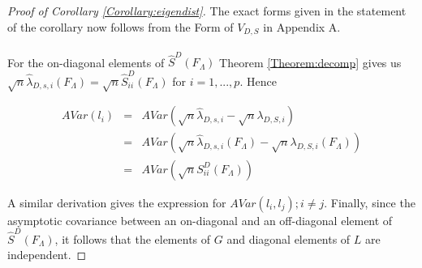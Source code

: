 \begin{proof}[Proof of Corollary \ref{Corollary:eigendist}]
The exact forms given in the statement of the corollary now follows from the  Form of $V_{D,S}$ in Appendix A.

\paragraph{}For the on-diagonal elements of $\hat S^D(F_\Lambda)$ Theorem \ref{Theorem:decomp} gives us $ \sqrt n \hat\lambda_{D,s,i} (F_\Lambda) = \sqrt n \hat S^D_{ii}(F_\Lambda)$ for $i = 1,...,p$. Hence

\begin{eqnarray*}
AVar(l_i) &=& AVar(\sqrt n \hat\lambda_{D,s,i} - \sqrt n \lambda_{D,S,i})\\
&=& AVar(\sqrt n \hat\lambda_{D,s,i} (F_\Lambda) - \sqrt n \lambda_{D,S,i}(F_\Lambda))\\
&=& AVar(\sqrt n S^D_{ii}(F_\Lambda))
\end{eqnarray*}

A similar derivation gives the expression for $AVar(l_i,l_j); i \neq j$. Finally, since the asymptotic covariance between an on-diagonal and an off-diagonal element of $\hat S^D(F_\Lambda)$, it follows that the elements of $G$ and diagonal elements of $L$ are independent.
\end{proof}